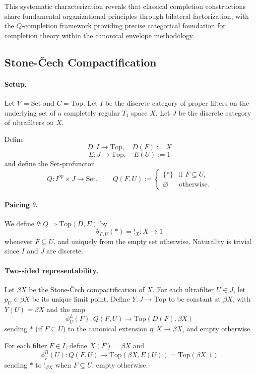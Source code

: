 \documentclass[11pt]{article}
\theoremstyle{plain}
\theoremstyle{definition}
\theoremstyle{remark}
\newcommand{\V}{\mathcal{V}}
\newcommand{\Top}{\mathrm{Top}}
\newcommand{\Set}{\mathrm{Set}}
\begin{document}
This systematic characterization reveals that classical completion constructions share fundamental organizational principles through bilateral factorization, with the $Q$-completion framework providing precise categorical foundation for completion theory within the canonical envelope methodology.

\subsection{Stone-\v{C}ech Compactification}\label{ssec:stone-cech}

\paragraph{Setup.}
Let $\V=\Set$ and $C=\Top$. Let $I$ be the discrete category of proper filters
on the underlying set of a completely regular $T_1$ space $X$. Let $J$ be the
discrete category of ultrafilters on $X$.

Define
$$
D:I \longrightarrow \Top,\quad D(F) := X
$$
$$
E:J \longrightarrow \Top,\quad E(U) := 1
$$
and define the $\Set$-profunctor
$$
Q:I^{op} \times J \longrightarrow \Set,\qquad
Q(F,U) :=
\begin{cases}
\{\ast\} & \text{if $F \subseteq U$},\\
\varnothing & \text{otherwise}.
\end{cases}
$$

\paragraph{Pairing $\theta$.}
We define $\theta:Q \Rightarrow \Top(D,E)$ by
$$
\theta_{F,U}(\ast) = !_X : X \to 1
$$
whenever $F \subseteq U$, and uniquely from the empty set otherwise. Naturality
is trivial since $I$ and $J$ are discrete.

\paragraph{Two-sided representability.}
Let $\beta X$ be the Stone-\v{C}ech compactification of $X$. For each ultrafilter
$U \in J$, let $p_U \in \beta X$ be its unique limit point. Define $Y:J\to\Top$
to be constant at $\beta X$, with $Y(U) = \beta X$ and the map
$$
\phi^L_U(F) : Q(F,U) \to \Top(D(F),\beta X)
$$
sending $\ast$ (if $F\subseteq U$) to the canonical extension $\eta:X \to \beta X$,
and empty otherwise.

For each filter $F\in I$, define $X(F) = \beta X$ and
$$
\phi^R_F(U): Q(F,U) \to \Top(\beta X, E(U)) = \Top(\beta X, 1)
$$
sending $\ast$ to $!_{\beta X}$ when $F \subseteq U$, empty otherwise.
\end{document}
